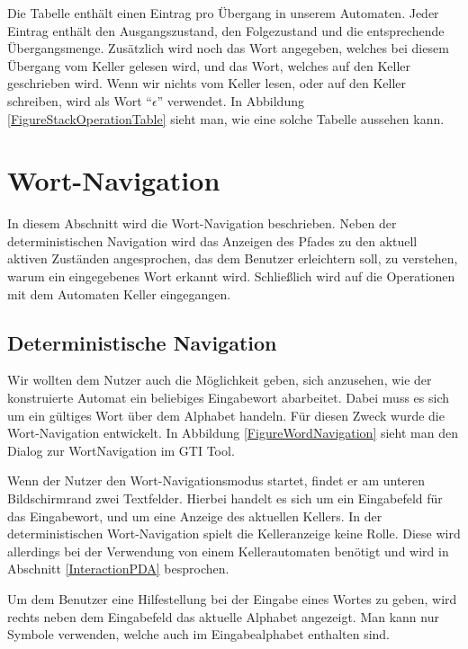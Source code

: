 Die Tabelle enthält einen Eintrag pro Übergang in unserem Automaten. Jeder
Eintrag enthält den Ausgangszustand, den Folgezustand
und die entsprechende Übergangsmenge. Zusätzlich wird noch das Wort
angegeben, welches bei diesem Übergang vom Keller gelesen wird, und das Wort,
welches auf den Keller geschrieben wird. Wenn wir nichts vom Keller lesen, oder
auf den Keller schreiben, wird als Wort "`$\epsilon$"' verwendet. In Abbildung
\ref{FigureStackOperationTable} sieht man, wie eine solche Tabelle aussehen
kann.\vspace{10pt}


\section{Wort-Navigation}\label{WordNavigation}

In diesem Abschnitt wird die Wort-Navigation beschrieben. Neben der
deterministischen Navigation wird das Anzeigen des Pfades zu den aktuell
aktiven Zuständen angesprochen, das dem Benutzer erleichtern soll, zu
verstehen, warum ein eingegebenes Wort erkannt wird. Schließlich wird auf die
Operationen mit dem Automaten Keller eingegangen.


\subsection{Deterministische Navigation}\label{WordNavigationDeterministic}

Wir wollten dem Nutzer auch die Möglichkeit geben, sich anzusehen, wie der
konstruierte Automat ein beliebiges Eingabewort abarbeitet. Dabei muss es sich
um ein gültiges Wort über dem Alphabet handeln. Für diesen Zweck wurde die
Wort-Navigation entwickelt. In Abbildung \ref{FigureWordNavigation}
sieht man den Dialog zur WortNavigation im GTI Tool.\vspace{10pt}

Wenn der Nutzer den Wort-Navigationsmodus startet, findet er am unteren
Bildschirmrand zwei Textfelder. Hierbei handelt es sich um ein Eingabefeld für
das Eingabewort, und um eine Anzeige des aktuellen Kellers. In der
deterministischen Wort-Navigation spielt die Kelleranzeige keine Rolle. Diese
wird allerdings bei der Verwendung von einem Kellerautomaten benötigt und wird
in Abschnitt \ref{InteractionPDA} besprochen.\vspace{10pt}

Um dem Benutzer eine Hilfestellung bei der Eingabe eines Wortes zu geben, wird
rechts neben dem Eingabefeld das aktuelle Alphabet angezeigt. Man kann nur
Symbole verwenden, welche auch im Eingabealphabet enthalten
sind.\vspace{10pt}

